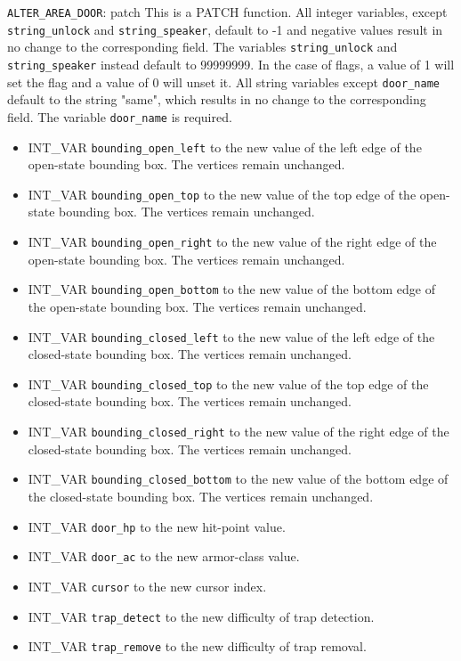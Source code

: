 \documentclass{article}
\begin{document}
\verb+ALTER_AREA_DOOR+: patch  This is a PATCH function. All integer variables, except \verb+string_unlock+ and \verb+string_speaker+, default to -1 and negative values result in no change to the corresponding field. The variables \verb+string_unlock+ and \verb+string_speaker+ instead default to 99999999. In the case of flags, a value of 1 will set the flag and a value of 0 will unset it. All string variables except \verb+door_name+ default to the string "same", which results in no change to the corresponding field. The variable \verb+door_name+ is required.
\begin{itemize}
\item INT_VAR \verb+bounding_open_left+ to the new value of the left edge of the open-state bounding box. The vertices remain unchanged.
\item INT_VAR \verb+bounding_open_top+ to the new value of the top edge of the open-state bounding box. The vertices remain unchanged.
\item INT_VAR \verb+bounding_open_right+ to the new value of the right edge of the open-state bounding box. The vertices remain unchanged.
\item INT_VAR \verb+bounding_open_bottom+ to the new value of the bottom edge of the open-state bounding box. The vertices remain unchanged.
\item INT_VAR \verb+bounding_closed_left+ to the new value of the left edge of the closed-state bounding box. The vertices remain unchanged.
\item INT_VAR \verb+bounding_closed_top+ to the new value of the top edge of the closed-state bounding box. The vertices remain unchanged.
\item INT_VAR \verb+bounding_closed_right+ to the new value of the right edge of the closed-state bounding box. The vertices remain unchanged.
\item INT_VAR \verb+bounding_closed_bottom+ to the new value of the bottom edge of the closed-state bounding box. The vertices remain unchanged.
\item INT_VAR \verb+door_hp+ to the new hit-point value.
\item INT_VAR \verb+door_ac+ to the new armor-class value.
\item INT_VAR \verb+cursor+ to the new cursor index.
\item INT_VAR \verb+trap_detect+ to the new difficulty of trap detection.
\item INT_VAR \verb+trap_remove+ to the new difficulty of trap removal.

\end{itemize}
\end{document}

